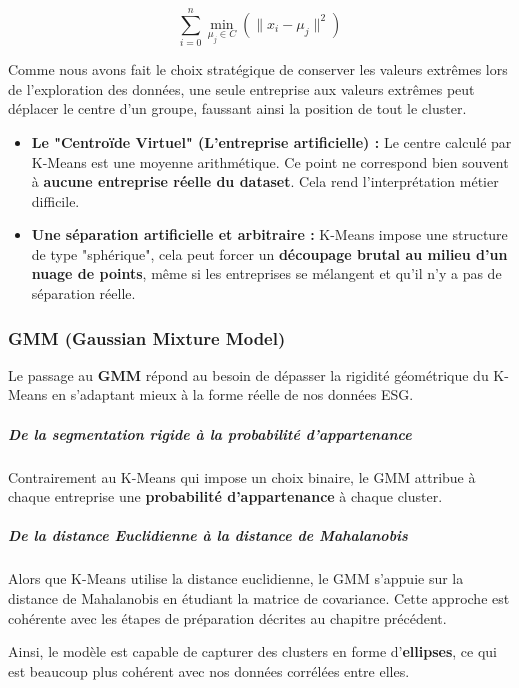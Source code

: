 \begin{equation}
\sum_{i=0}^{n} \min_{\mu_j \in C} \left( \|x_i - \mu_j\|^2 \right)
\end{equation}

Comme nous avons fait le choix stratégique de conserver les valeurs extrêmes lors de l'exploration des données, une seule entreprise aux valeurs extrêmes peut déplacer le centre d’un groupe, faussant ainsi la position de tout le cluster.

\begin{itemize}
    \item \textbf{Le "Centroïde Virtuel" (L’entreprise artificielle) :} Le centre calculé par K-Means est une moyenne arithmétique. Ce point ne correspond bien souvent à \textbf{aucune entreprise réelle du dataset}. Cela rend l’interprétation métier difficile.

    \item \textbf{Une séparation artificielle et arbitraire :} K-Means impose une structure de type "sphérique", cela peut forcer un \textbf{découpage brutal au milieu d’un nuage de points}, même si les entreprises se mélangent et qu’il n’y a pas de séparation réelle.
\end{itemize}\cite{sklearn_kmeans}
\subsubsection{GMM (Gaussian Mixture Model)}

Le passage au \textbf{GMM} répond au besoin de dépasser la rigidité géométrique du K-Means en s'adaptant mieux à la forme réelle de nos données ESG.

\subparagraph{De la segmentation rigide à la probabilité d'appartenance}

Contrairement au K-Means qui impose un choix binaire, le GMM attribue à chaque entreprise une \textbf{probabilité d'appartenance} à chaque cluster.

\subparagraph{De la distance Euclidienne à la distance de Mahalanobis}

Alors que K-Means utilise la distance euclidienne, le GMM s'appuie sur la distance de Mahalanobis en étudiant la matrice de covariance. Cette approche est cohérente avec les étapes de préparation décrites au chapitre précédent. 

Ainsi, le modèle est capable de capturer des clusters en forme d'\textbf{ellipses}, ce qui est beaucoup plus cohérent avec nos données corrélées entre elles.

